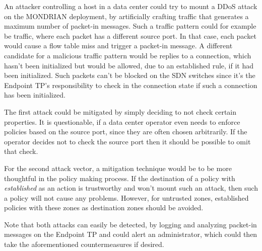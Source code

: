 An attacker controlling a host in a data center could try to mount a \acs{DDoS} attack on the MONDRIAN deployment, by artificially crafting traffic that generates a maximum number of packet-in messages. Such a traffic pattern could for example be traffic, where each packet has a different source port. In that case, each packet would cause a flow table miss and trigger a packet-in message. A different candidate for a malicious traffic pattern would be replies to a connection, which hasn't been initialized but would be allowed, due to an established rule, if it had been initialized. Such packets can't be blocked on the \acs{SDN} switches since it's the Endpoint \acs{TP}'s responsibility to check in the connection state if such a connection has been initialized.

The first attack could be mitigated by simply deciding to not check certain properties. It is questionable, if a data center operator even needs to enforce policies based on the source port, since they are often chosen arbitrarily. If the operator decides not to check the source port then it should be possible to omit that check.

For the second attack vector, a mitigation technique would be to be more thoughtful in the policy making process. If the destination of a policy with \textit{established} as an action is trustworthy and won't mount such an attack, then such a policy will not cause any problems. However, for untrusted zones, established policies with these zones as destination zones should be avoided.

Note that both attacks can easily be detected, by logging and analyzing packet-in messages on the Endpoint \acs{TP} and could alert an administrator, which could then take the aforementioned countermeasures if desired.

